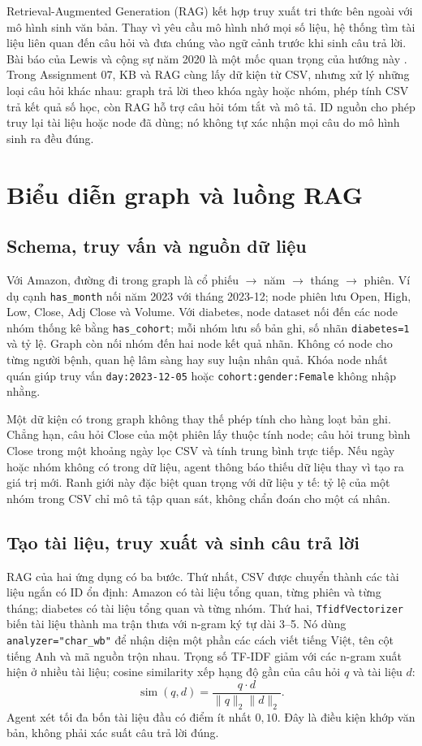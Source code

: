 \documentclass[12pt,a4paper]{report}
\begin{document}
Retrieval-Augmented Generation (RAG) kết hợp truy xuất tri thức bên ngoài với mô hình sinh văn bản.
Thay vì yêu cầu mô hình nhớ mọi số liệu, hệ thống tìm tài liệu liên quan đến câu hỏi và đưa chúng
vào ngữ cảnh trước khi sinh câu trả lời. Bài báo của Lewis và cộng sự năm 2020 là một mốc quan
trọng của hướng này \cite{essay03-lewis}. Trong Assignment 07, KB và RAG cùng lấy dữ kiện từ CSV,
nhưng xử lý những loại câu hỏi khác nhau: graph trả lời theo khóa ngày hoặc nhóm, phép tính CSV
trả kết quả số học, còn RAG hỗ trợ câu hỏi tóm tắt và mô tả. ID nguồn cho phép truy lại tài liệu
hoặc node đã dùng; nó không tự xác nhận mọi câu do mô hình sinh ra đều đúng.

\section{Biểu diễn graph và luồng RAG}
\subsection{Schema, truy vấn và nguồn dữ liệu}
Với Amazon, đường đi trong graph là cổ phiếu $\rightarrow$ năm $\rightarrow$ tháng
$\rightarrow$ phiên. Ví dụ cạnh \texttt{has\_month} nối năm 2023 với tháng 2023-12;
node phiên lưu Open, High, Low, Close, Adj Close và Volume. Với diabetes, node dataset nối đến
các node nhóm thống kê bằng \texttt{has\_cohort}; mỗi nhóm lưu số bản ghi, số nhãn
\texttt{diabetes=1} và tỷ lệ. Graph còn nối nhóm đến hai node kết quả nhãn. Không có node cho
từng người bệnh, quan hệ lâm sàng hay suy luận nhân quả. Khóa node nhất quán giúp truy vấn
\texttt{day:2023-12-05} hoặc \texttt{cohort:gender:Female} không nhập nhằng.

Một dữ kiện có trong graph không thay thế phép tính cho hàng loạt bản ghi. Chẳng hạn, câu hỏi Close
của một phiên lấy thuộc tính node; câu hỏi trung bình Close trong một khoảng ngày lọc CSV và tính
trung bình trực tiếp. Nếu ngày hoặc nhóm không có trong dữ liệu, agent thông báo thiếu dữ liệu
thay vì tạo ra giá trị mới. Ranh giới này đặc biệt quan trọng với dữ liệu y tế: tỷ lệ của một nhóm
trong CSV chỉ mô tả tập quan sát, không chẩn đoán cho một cá nhân.

\subsection{Tạo tài liệu, truy xuất và sinh câu trả lời}
RAG của hai ứng dụng có ba bước. Thứ nhất, CSV được chuyển thành các tài liệu ngắn có ID ổn định:
Amazon có tài liệu tổng quan, từng phiên và từng tháng; diabetes có tài liệu tổng quan và từng nhóm.
Thứ hai, \texttt{TfidfVectorizer} biến tài liệu thành ma trận thưa với n-gram ký tự dài 3--5.
Nó dùng \texttt{analyzer="char\_wb"} để nhận diện một phần các cách viết tiếng Việt, tên cột
tiếng Anh và mã nguồn trộn nhau. Trọng số TF-IDF giảm với các n-gram xuất hiện ở nhiều tài liệu;
cosine similarity xếp hạng độ gần của câu hỏi $q$ và tài liệu $d$:
\begin{equation}
\operatorname{sim}(q,d)=\frac{q\cdot d}{\lVert q\rVert_2\lVert d\rVert_2}.
\end{equation}
Agent xét tối đa bốn tài liệu đầu có điểm ít nhất $0{,}10$. Đây là điều kiện khớp văn bản, không
phải xác suất câu trả lời đúng.
\end{document}
